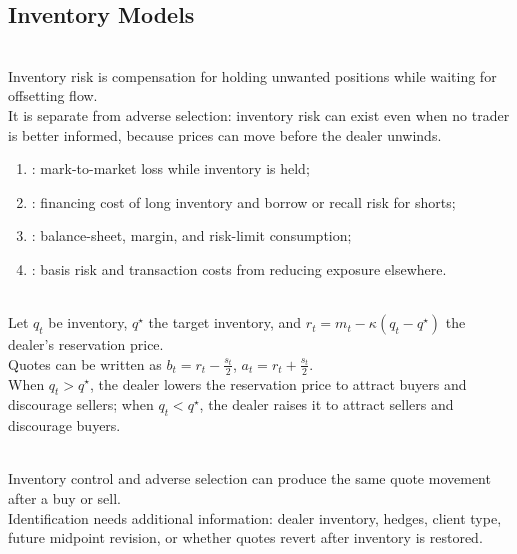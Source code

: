 \subsection{Inventory Models}

\begin{principle} \\
Inventory risk is compensation for holding unwanted positions while waiting for offsetting flow.\\
It is separate from adverse selection: inventory risk can exist even when no trader is better informed, because prices can move before the dealer unwinds.
\end{principle}

\begin{taxonomy} 
\begin{enumerate}[label=\roman*.]
\setlength{\itemsep}{0pt}
\item {}: mark-to-market loss while inventory is held;
\item {}: financing cost of long inventory and borrow or recall risk for shorts;
\item {}: balance-sheet, margin, and risk-limit consumption;
\item {}: basis risk and transaction costs from reducing exposure elsewhere.
\end{enumerate}
\end{taxonomy}

\begin{model} \\
Let $q_t$ be inventory, $q^\star$ the target inventory, and $r_t=m_t-\kappa(q_t-q^\star)$ the dealer's reservation price.\\
Quotes can be written as $b_t=r_t-\frac{s_t}{2}$, $a_t=r_t+\frac{s_t}{2}$.\\
When $q_t>q^\star$, the dealer lowers the reservation price to attract buyers and discourage sellers; when $q_t<q^\star$, the dealer raises it to attract sellers and discourage buyers.
\end{model}

\begin{caveat} \\
Inventory control and adverse selection can produce the same quote movement after a buy or sell.\\
Identification needs additional information: dealer inventory, hedges, client type, future midpoint revision, or whether quotes revert after inventory is restored.
\end{caveat}
